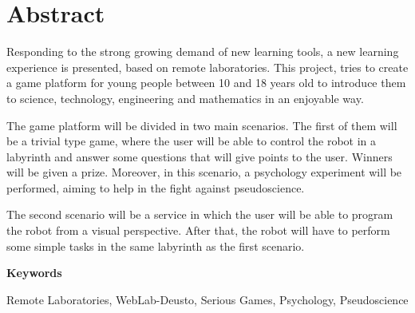\chapter*{Abstract}

Responding to the strong growing demand of new learning tools, a new learning experience is
presented, based on remote laboratories. This project, tries to create a game platform for young
people between 10 and 18 years old to introduce them to science, technology, engineering and
mathematics in an enjoyable way.

The game platform will be divided in two main scenarios. The first of them will be a trivial type
game, where the user will be able to control the robot in a labyrinth and answer some questions that
will give points to the user. Winners will be given a prize. Moreover, in this scenario, a
psychology experiment will be performed, aiming to help in the fight against pseudoscience.

The second scenario will be a service in which the user will be able to program the robot from a
visual perspective. After that, the robot will have to perform some simple tasks in the same
labyrinth as the first scenario.

\vspace{2em}

{\Large\bfseries\sffamily Keywords}
\vspace{3\medskipamount}

Remote Laboratories, WebLab-Deusto, Serious Games, Psychology, Pseudoscience
